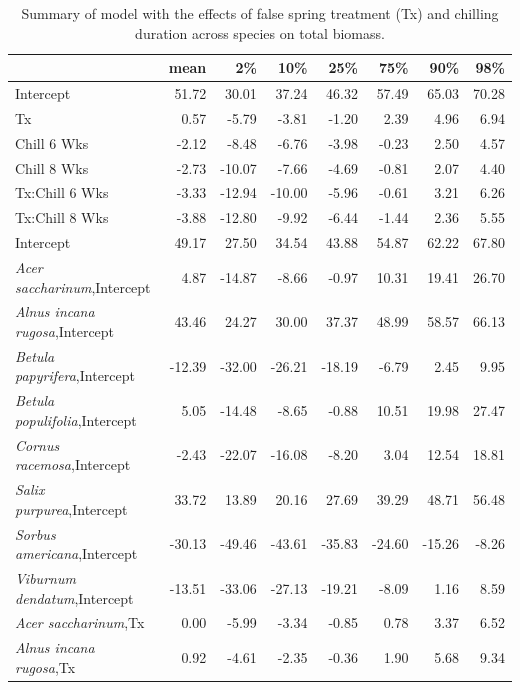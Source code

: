 \documentclass{article}\usepackage[]{graphicx}\usepackage[]{color}
\begin{document}
\newpage
\begin{longtable}{lrrrrrrr}
\caption{Summary of model with the effects of false spring treatment (Tx) and chilling duration across species on total biomass.} \\ 
  \hline
 & mean & 2\% & 10\% & 25\% & 75\% & 90\% & 98\% \\ 
  \hline \endhead  \hline
Intercept & 51.72 & 30.01 & 37.24 & 46.32 & 57.49 & 65.03 & 70.28 \\ 
  Tx & 0.57 & -5.79 & -3.81 & -1.20 & 2.39 & 4.96 & 6.94 \\ 
  Chill 6 Wks & -2.12 & -8.48 & -6.76 & -3.98 & -0.23 & 2.50 & 4.57 \\ 
  Chill 8 Wks & -2.73 & -10.07 & -7.66 & -4.69 & -0.81 & 2.07 & 4.40 \\ 
  Tx:Chill 6 Wks & -3.33 & -12.94 & -10.00 & -5.96 & -0.61 & 3.21 & 6.26 \\ 
  Tx:Chill 8 Wks & -3.88 & -12.80 & -9.92 & -6.44 & -1.44 & 2.36 & 5.55 \\ 
  Intercept & 49.17 & 27.50 & 34.54 & 43.88 & 54.87 & 62.22 & 67.80 \\ 
  \textit{Acer saccharinum},Intercept & 4.87 & -14.87 & -8.66 & -0.97 & 10.31 & 19.41 & 26.70 \\ 
  \textit{Alnus incana rugosa},Intercept & 43.46 & 24.27 & 30.00 & 37.37 & 48.99 & 58.57 & 66.13 \\ 
  \textit{Betula papyrifera},Intercept & -12.39 & -32.00 & -26.21 & -18.19 & -6.79 & 2.45 & 9.95 \\ 
  \textit{Betula populifolia},Intercept & 5.05 & -14.48 & -8.65 & -0.88 & 10.51 & 19.98 & 27.47 \\ 
  \textit{Cornus racemosa},Intercept & -2.43 & -22.07 & -16.08 & -8.20 & 3.04 & 12.54 & 18.81 \\ 
  \textit{Salix purpurea},Intercept & 33.72 & 13.89 & 20.16 & 27.69 & 39.29 & 48.71 & 56.48 \\ 
  \textit{Sorbus americana},Intercept & -30.13 & -49.46 & -43.61 & -35.83 & -24.60 & -15.26 & -8.26 \\ 
  \textit{Viburnum dendatum},Intercept & -13.51 & -33.06 & -27.13 & -19.21 & -8.09 & 1.16 & 8.59 \\ 
  \textit{Acer saccharinum},Tx & 0.00 & -5.99 & -3.34 & -0.85 & 0.78 & 3.37 & 6.52 \\ 
  \textit{Alnus incana rugosa},Tx & 0.92 & -4.61 & -2.35 & -0.36 & 1.90 & 5.68 & 9.34 \\ 

\end{longtable}
\end{document}
